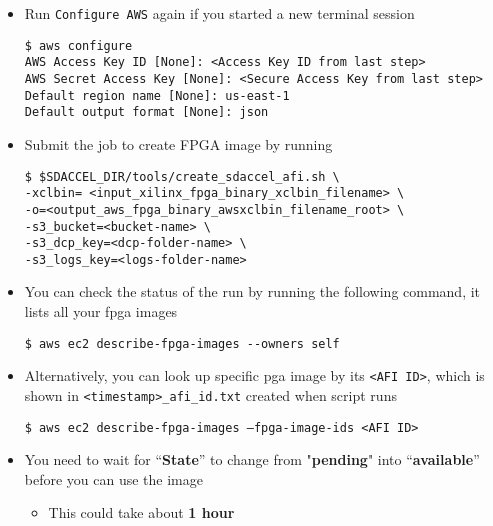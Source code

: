 \documentclass[]{article}
\begin{document}
\begin{itemize}
\item
  Run \texttt{Configure\ AWS} again if you started a new terminal
  session

\begin{verbatim}
$ aws configure
AWS Access Key ID [None]: <Access Key ID from last step>
AWS Secret Access Key [None]: <Secure Access Key from last step>
Default region name [None]: us-east-1
Default output format [None]: json
\end{verbatim}
\end{itemize}

\begin{itemize}
\item
  Submit the job to create FPGA image by running

\begin{verbatim}
$ $SDACCEL_DIR/tools/create_sdaccel_afi.sh \
-xclbin= <input_xilinx_fpga_binary_xclbin_filename> \
-o=<output_aws_fpga_binary_awsxclbin_filename_root> \
-s3_bucket=<bucket-name> \
-s3_dcp_key=<dcp-folder-name> \
-s3_logs_key=<logs-folder-name>
\end{verbatim}
\end{itemize}

\begin{itemize}
\item
  You can check the status of the run by running the following command,
  it lists all your fpga images

\begin{verbatim}
$ aws ec2 describe-fpga-images --owners self
\end{verbatim}
\end{itemize}

\begin{itemize}
\item
  Alternatively, you can look up specific pga image by its
  \texttt{\textless{}AFI\ ID\textgreater{}}, which is shown in
  \texttt{\textless{}timestamp\textgreater{}\_afi\_id.txt} created when
  script runs

\begin{verbatim}
$ aws ec2 describe-fpga-images –fpga-image-ids <AFI ID>
\end{verbatim}
\end{itemize}

\begin{itemize}
\item
  You need to wait for ``\textbf{State}'' to change from
  "\textbf{pending}" into ``\textbf{available}'' before you can use the
  image

  \begin{itemize}
  \item
    This could take about \textbf{1 hour}
  \end{itemize}
\end{itemize}
\end{document}
